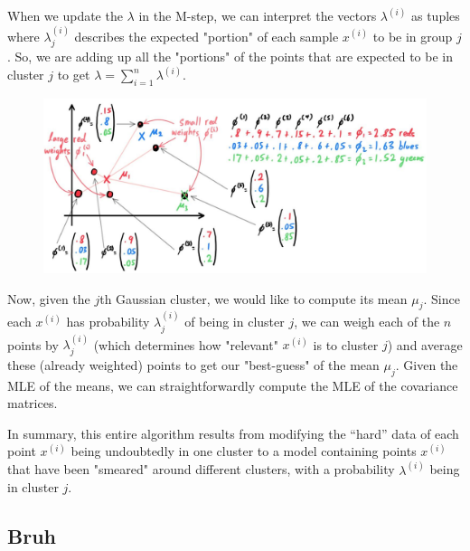   When we update the $\lambda$ in the M-step, we can interpret the vectors $\lambda^{(i)}$ as tuples where $\lambda^{(i)}_j$ describes the expected "portion" of each sample $x^{(i)}$ to be in group $j$. So, we are adding up all the "portions" of the points that are expected to be in cluster $j$ to get $\lambda= \sum_{i=1}^n \lambda^{(i)}$. 

  \begin{figure}[H]
    \centering 
    \includegraphics[scale=0.2]{img/weighted_means.jpg}
    \caption{}
    \label{fig:weighted_means}
  \end{figure}

  Now, given the $j$th Gaussian cluster, we would like to compute its mean $\mu_j$. Since each $x^{(i)}$ has probability $\lambda^{(i)}_j$ of being in cluster $j$, we can weigh each of the $n$ points by $\lambda^{(i)}_j$ (which determines how "relevant" $x^{(i)}$ is to cluster $j$) and average these (already weighted) points to get our "best-guess" of the mean $\mu_j$. Given the MLE of the means, we can straightforwardly compute the MLE of the covariance matrices. 

  In summary, this entire algorithm results from modifying the ``hard'' data of each point $x^{(i)}$ being undoubtedly in one cluster to a model containing points $x^{(i)}$ that have been "smeared" around different clusters, with a probability $\lambda^{(i)}$ being in cluster $j$. 

\subsection{Bruh}

